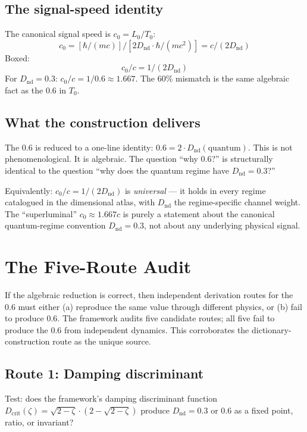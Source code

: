 \documentclass[11pt,a4paper]{article}
\begin{document}
\subsection{The signal-speed identity}

The canonical signal speed is $c_0 = L_0/T_0$:
\[
c_0 = [\hbar/(mc)] / [2 D_\mathrm{nd} \cdot \hbar/(mc^{2})] = c / (2 D_\mathrm{nd})
\]
Boxed:
\[
\boxed{c_0 / c = 1 / (2 D_\mathrm{nd})}
\]
For $D_\mathrm{nd} = 0.3$: $c_0/c = 1/0.6 \approx 1.667$. The 60\% mismatch is the same algebraic fact as the 0.6 in $T_0$.

\subsection{What the construction delivers}

The 0.6 is reduced to a one-line identity: $0.6 = 2 \cdot D_\mathrm{nd}(\mathrm{quantum})$. This is not phenomenological. It is algebraic. The question ``why 0.6?'' is structurally identical to the question ``why does the quantum regime have $D_\mathrm{nd} = 0.3$?''

Equivalently: $c_0/c = 1/(2 D_\mathrm{nd})$ is \emph{universal} --- it holds in every regime catalogued in the dimensional atlas, with $D_\mathrm{nd}$ the regime-specific channel weight. The ``superluminal'' $c_0 \approx 1.667 c$ is purely a statement about the canonical quantum-regime convention $D_\mathrm{nd} = 0.3$, not about any underlying physical signal.

\section{The Five-Route Audit}

If the algebraic reduction is correct, then independent derivation routes for the 0.6 must either (a) reproduce the same value through different physics, or (b) fail to produce 0.6. The framework audits five candidate routes; all five fail to produce the 0.6 from independent dynamics. This corroborates the dictionary-construction route as the unique source.

\subsection{Route 1: Damping discriminant}

Test: does the framework's damping discriminant function $D_\mathrm{crit}(\zeta) = \sqrt{2-\zeta} \cdot (2 - \sqrt{2-\zeta})$ produce $D_\mathrm{nd} = 0.3$ or $0.6$ as a fixed point, ratio, or invariant?
\end{document}
